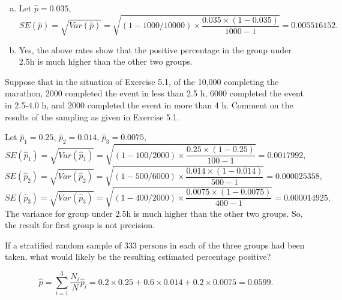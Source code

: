 \documentclass[12pt]{article}
\begin{document}
    \begin{solution}
        \begin{enumerate}[a. ]
            \item Let $\hat{p}=0.035$, 
            \[
                SE(\hat{p})=\sqrt{Var(\hat{p})}=\sqrt{(1-1000/10000)\times\frac{0.035\times(1-0.035)}{1000-1}}=0.005516152. 
            \]
            \item Yes, the above rates show that the positive percentage in the group under 2.5h is much higher than the other two groups. 
        \end{enumerate}
    \end{solution}

    \begin{exercise}[Levy-5.2]
        Suppose that in the situation of Exercise 5.1, of the 10,000 completing the marathon, 2000 completed the event in less than 2.5 h, 6000 completed the event in 2.5-4.0 h, and 2000 completed the event in more than 4 h. Comment on the results of the sampling as given in Exercise 5.1. 
    \end{exercise}

    \begin{solution}
        Let $\hat{p}_1=0.25$, $\hat{p}_2=0.014$, $\hat{p}_3=0.0075$, 
        \[
            SE(\hat{p}_1)=\sqrt{Var(\hat{p}_1)}=\sqrt{(1-100/2000)\times\frac{0.25\times(1-0.25)}{100-1}}=0.0017992, 
        \]
        \[
            SE(\hat{p}_2)=\sqrt{Var(\hat{p}_2)}=\sqrt{(1-500/6000)\times\frac{0.014\times(1-0.014)}{500-1}}=0.000025358, 
        \]
        \[
            SE(\hat{p}_3)=\sqrt{Var(\hat{p}_3)}=\sqrt{(1-400/2000)\times\frac{0.0075\times(1-0.0075)}{400-1}}=0.000014925, 
        \]
        The variance for group under 2.5h is much higher than the other two groups. So, the result for first group is not precision. 
    \end{solution}

    \begin{exercise}[Levy-5.3]
        If a stratified random sample of 333 persons in each of the three groups had been taken, what would likely be the resulting estimated percentage positive? 
    \end{exercise}

    \begin{solution}
        \[
            \hat{p}=\sum_{i=1}^3\frac{N_i}{N}\hat{p}_i=0.2\times 0.25+0.6\times 0.014+0.2\times0.0075=0.0599. 
        \]
    \end{solution}
\end{document}
